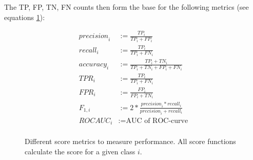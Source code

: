 The TP, FP, TN, FN counts then form the base for the following metrics (see equations \ref{metrics}):
\begin{figure}[H]
	\begin{equation} 
		\begin{aligned}
			\mathit{precision}_i &:= \frac{\mathit{TP_i}}{\mathit{TP_i}+\mathit{FP_i}} \\
			\mathit{recall}_i &:= \frac{\mathit{TP_i}}{\mathit{TP_i}+\mathit{FN_i}} \\
			\mathit{accuracy}_i &:= \frac{\mathit{TP_i}+\mathit{TN_i}}{\mathit{TP_i}+\mathit{TN_i}+\mathit{FP_i}+\mathit{FN_i}} \\
			\mathit{TPR}_i &:= \frac{\mathit{TP_i}}{\mathit{TP_i}+\mathit{FN_i}}\\
			\mathit{FPR}_i  &:= \frac{\mathit{FP_i}}{\mathit{FP_i}+\mathit{TN_i}}\\
			\mathit{F_{1,i}} &:= 2*\frac{\mathit{precision}_i*\mathit{recall}_i}{\mathit{precision}_i+\mathit{recall}_i}\\
			\mathit{ROC} \mathit{AUC}_i &:= \text{AUC of ROC-curve}\\%
		\end{aligned}
	\end{equation}
	\caption{Different score metrics to measure performance. All score functions calculate the score for a given class $i$.}
	\label{metrics}
\end{figure}


